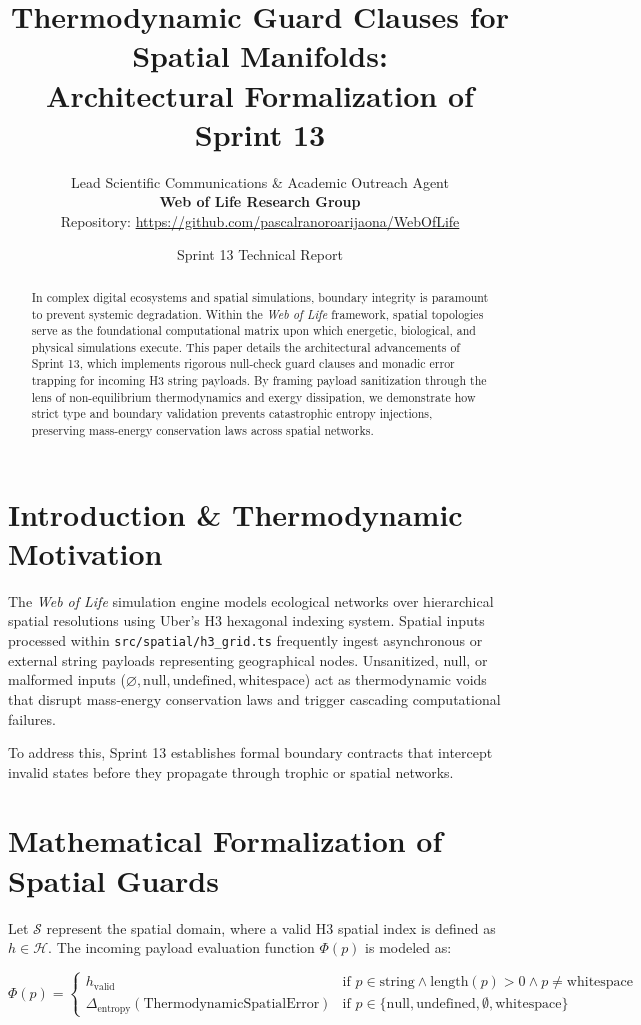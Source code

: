 \documentclass[11pt, a4paper]{article}
\title{\textbf{Thermodynamic Guard Clauses for Spatial Manifolds: \\ Architectural Formalization of Sprint 13}}
\author{Lead Scientific Communications \& Academic Outreach Agent \\ \textbf{Web of Life Research Group} \\ Repository: \url{https://github.com/pascalranoroarijaona/WebOfLife}}
\date{Sprint 13 Technical Report}
\begin{document}
\maketitle

\begin{abstract}
In complex digital ecosystems and spatial simulations, boundary integrity is paramount to prevent systemic degradation. Within the \emph{Web of Life} framework, spatial topologies serve as the foundational computational matrix upon which energetic, biological, and physical simulations execute. This paper details the architectural advancements of Sprint 13, which implements rigorous null-check guard clauses and monadic error trapping for incoming H3 string payloads. By framing payload sanitization through the lens of non-equilibrium thermodynamics and exergy dissipation, we demonstrate how strict type and boundary validation prevents catastrophic entropy injections, preserving mass-energy conservation laws across spatial networks.
\end{abstract}

\section{Introduction \& Thermodynamic Motivation}
The \emph{Web of Life} simulation engine models ecological networks over hierarchical spatial resolutions using Uber's H3 hexagonal indexing system. Spatial inputs processed within \texttt{src/spatial/h3\_grid.ts} frequently ingest asynchronous or external string payloads representing geographical nodes. Unsanitized, null, or malformed inputs ($\varnothing, \text{null}, \text{undefined}, \text{whitespace}$) act as thermodynamic voids that disrupt mass-energy conservation laws and trigger cascading computational failures.

To address this, Sprint 13 establishes formal boundary contracts that intercept invalid states before they propagate through trophic or spatial networks.

\section{Mathematical Formalization of Spatial Guards}
Let $\mathcal{S}$ represent the spatial domain, where a valid H3 spatial index is defined as $h \in \mathcal{H}$. The incoming payload evaluation function $\Phi(p)$ is modeled as:

$$\Phi(p) = \begin{cases} 
h_{\text{valid}} & \text{if } p \in \text{string} \land \text{length}(p) > 0 \land p \neq \text{whitespace} \\
\Delta_{\text{entropy}} (\text{ThermodynamicSpatialError}) & \text{if } p \in \{\text{null}, \text{undefined}, \emptyset, \text{whitespace}\}
\end{cases}$$
\end{document}
